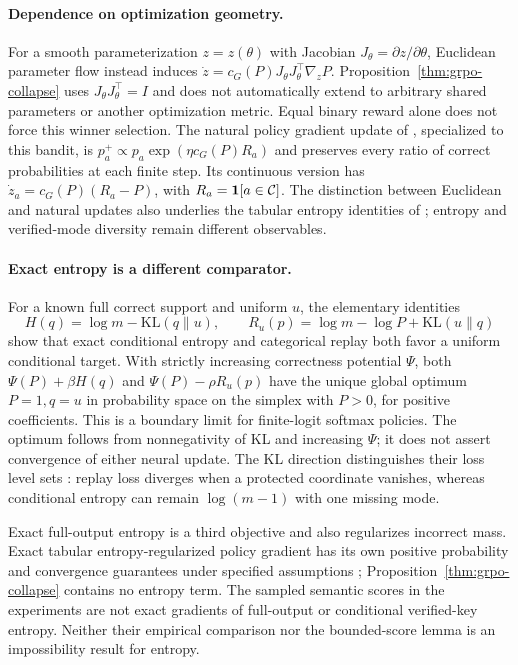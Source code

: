 \paragraph{Dependence on optimization geometry.}
For a smooth parameterization $z=z(\theta)$ with Jacobian
$J_\theta=\partial z/\partial\theta$, Euclidean parameter flow instead
induces $\dot z=c_G(P)J_\theta J_\theta^\top\nabla_zP$. Proposition~\ref{thm:grpo-collapse}
uses $J_\theta J_\theta^\top=I$ and does not automatically
extend to arbitrary shared parameters or another optimization metric. Equal
binary reward alone does not force this winner selection. The natural policy
gradient update of \citet[Lemma~15]{agarwal2021policygradient}, specialized to
this bandit, is $p_a^+\propto p_a\exp(\eta c_G(P)R_a)$ and preserves
every ratio of correct probabilities at each finite step. Its continuous
version has $\dot z_a=c_G(P)(R_a-P)$, with
$R_a=\mathbf 1[a\in\mathcal C]$. The distinction between Euclidean and natural
updates also underlies the tabular entropy identities of
\citet[Theorems~1--2]{cui2025entropy}; entropy and verified-mode diversity
remain different observables.

\paragraph{Exact entropy is a different comparator.}
For a known full correct support and uniform $u$, the elementary identities
\[
 H(q)=\log m-\mathrm{KL}(q\|u),\qquad
 R_u(p)=\log m-\log P+\mathrm{KL}(u\|q)
\]
show that exact conditional entropy and categorical replay both favor a
uniform conditional target. With strictly increasing correctness potential
$\Psi$, both $\Psi(P)+\beta H(q)$ and $\Psi(P)-\rho R_u(p)$ have the unique
global optimum $P=1,q=u$ in probability space on the simplex with $P>0$,
for positive coefficients. This is a boundary limit for finite-logit softmax
policies. The optimum follows from nonnegativity of KL and increasing
$\Psi$; it does not assert convergence of either neural update. The KL direction distinguishes their
loss level sets \citep{pereyra2017confidencepenalty,agarwal2021policygradient}:
replay loss diverges when a protected coordinate vanishes, whereas
conditional entropy can remain $\log(m-1)$ with one missing mode.

Exact full-output entropy is a third objective and also regularizes incorrect
mass. Exact tabular entropy-regularized policy gradient has its own positive
probability and convergence guarantees under specified assumptions
\citep{mei2020softmaxpg}; Proposition~\ref{thm:grpo-collapse} contains no entropy term.
The sampled semantic scores in the experiments are not exact gradients of
full-output or conditional verified-key entropy. Neither their empirical
comparison nor the bounded-score lemma is an impossibility result for entropy.

